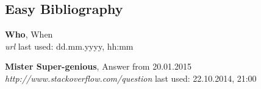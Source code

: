 \documentclass[12pt]{article}
\begin{document}
\newpage
\listoftables
\listoffigures
\printglossaries
 

\subsection{Easy Bibliography}
\begin{thebibliography}{56}

   \textbf{Who}, When\\
  \textit{url}
  \newline last used: dd.mm.yyyy, hh:mm
 
  \textbf{Mister Super-genious}, Answer from 20.01.2015\\
  \textit{http://www.stackoverflow.com/question}
  \newline last used: 22.10.2014, 21:00
  
  
\end{thebibliography}
\end{document}
